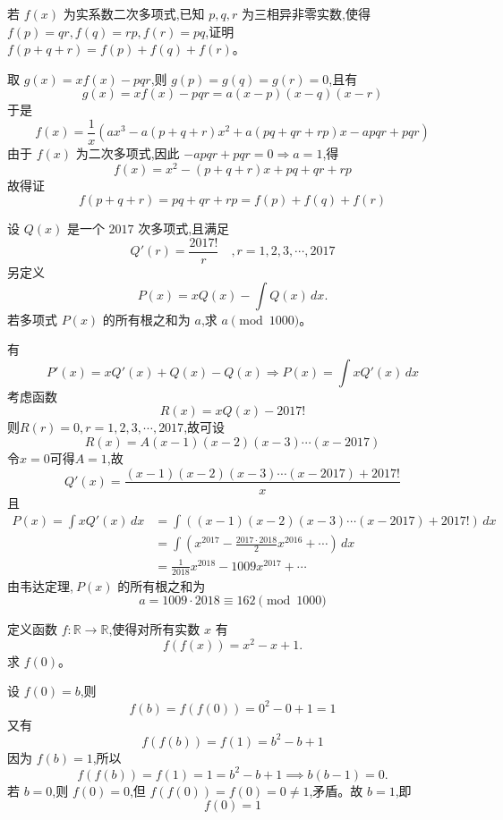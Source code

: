 \begin{questions}
    \question 若 $f(x)$ 为实系数二次多项式,已知 $p,q,r$ 为三相异非零实数,使得 $f(p)=qr,f(q)=rp,f(r)=pq$,证明$f(p+q+r) = f(p)+f(q)+f(r)$。
    \begin{solution}
        取 $g(x) = x f(x) - pqr$,则 $g(p) = g(q) = g(r) = 0$,且有
        \[
        g(x) = x f(x) - pqr = a(x - p)(x - q)(x - r)
        \]
        于是
        \[
        f(x) = \frac{1}{x} \left( a x^3 - a(p + q + r)x^2 + a(pq + qr + rp)x - apqr + pqr \right)
        \]
        由于 $f(x)$ 为二次多项式,因此 $-apqr + pqr = 0 \Rightarrow a = 1$,得
        \[
        f(x) = x^2 - (p + q + r)x + pq + qr + rp
        \]
        故得证
        \[
        f(p + q + r) = pq + qr + rp = f(p)+f(q)+f(r)
        \]
    \end{solution}
    
    \question 设 $Q(x)$ 是一个 $2017$ 次多项式,且满足
    \[
    Q'(r)=\frac{2017!}{r} \quad ,r=1,2,3,\cdots, 2017
    \]
    另定义
    \[
    P(x)=xQ(x)-\int Q(x)\,dx.
    \]
    若多项式 $P(x)$ 的所有根之和为 $a$,求 $a \pmod{1000}$。
    \begin{solution}
        有
        \[
        P'(x)=xQ'(x) +Q(x)-Q(x) \Rightarrow P(x) = \int xQ'(x)\,dx
        \]
        考虑函数
        \[
        R(x)=xQ(x)-2017!
        \]
        则$R(r)=0,r=1,2,3,\cdots, 2017$,故可设
        \[
        R(x)=A(x-1)(x-2)(x-3)\cdots(x-2017)
        \]
        令$x=0$可得$A=1$,故
        \[
        Q'(x)=\frac{(x-1)(x-2)(x-3)\cdots(x-2017)+2017!}{x}
        \]
        且
        \begin{align*}
        P(x) = \int xQ'(x)\,dx 
        &= \int ((x-1)(x-2)(x-3)\cdots(x-2017)+2017!)\,dx \\
        &=\int \left(x^{2017}-\frac{2017\cdot2018}{2}x^{2016} +\cdots\right)\,dx \\
        &=\frac{1}{2018}x^{2018} - 1009 x^{2017}+\cdots
        \end{align*}
        由韦达定理,$\ P(x)$ 的所有根之和为 
        \[
        a=1009 \cdot 2018 \equiv 162 \pmod{1000}
        \]
    \end{solution}

    \question 定义函数 $f:\mathbb{R} \to \mathbb{R}$,使得对所有实数 $x$ 有
    \[
    f(f(x)) = x^2 - x + 1.
    \]
    求 $f(0)$。
    \begin{solution}
        设 $f(0) = b$,则
        \[
        f(b) = f(f(0)) = 0^2 - 0 + 1 = 1
        \]
        又有
        \[
        f(f(b)) = f(1) = b^2 - b + 1
        \]
        因为 $f(b) = 1$,所以
        \[
        f(f(b)) = f(1) = 1 = b^2 - b + 1 \implies b(b-1) = 0.
        \]
        若 $b=0$,则 $f(0)=0$,但 $f(f(0)) = f(0) = 0 \neq 1$,矛盾。故 $b = 1$,即
        \[
        f(0) = 1
        \]
    \end{solution}


\end{questions}
